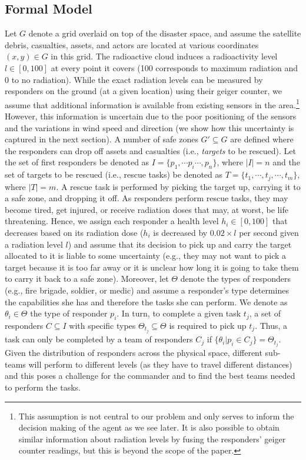 \subsection{Formal Model}
\noindent Let $G$ denote a grid overlaid on top of the disaster space, and assume the satellite debris, casualties, assets, and actors are located at various coordinates $(x,y) \in G$ in this grid. The radioactive cloud induces a radioactivity level  $l \in [0,100]$ at every point it covers (100 corresponds to maximum radiation and 0 to no radiation). While the exact radiation levels can be measured by responders on the ground (at a given location) using their geiger counter, we assume that additional information is available  from existing sensors  in the area.\footnote{This assumption is not central to our problem and only serves to inform the decision making of the agent as we see later. It is also possible to obtain similar information about radiation levels by fusing the responders' geiger counter readings, but this is beyond the scope of the paper.} However, this information is uncertain due to the poor positioning of the sensors and the variations in wind speed and direction (we show how this uncertainty is captured in the next section). A number of safe zones $G' \subseteq G$ are defined where the responders can drop off assets and casualties (i.e., \emph{targets} to be rescued). Let the set of first responders be denoted as $I = \{p_1, \cdots p_i \cdots, p_n\}$, where $|I| = n$ and the set of  targets to be rescued (i.e., rescue tasks) be denoted as  $T = \{t_1,\cdots, t_j, \cdots, t_m\}$, where $|T| = m$. A rescue task is performed by picking the target up, carrying it to a safe zone, and dropping it off.  As responders perform rescue tasks, they may become tired, get injured, or receive radiation doses that may, at worst, be life threatening. Hence, we assign each responder  a health level $h_i\in [0,100]$ that decreases based on its radiation dose ($h_i$ is decreased by $0.02 \times l$ per second given a radiation level $l$) and assume that its decision to pick up and carry the target allocated to it is liable to some uncertainty (e.g., they may not want to pick a target because it is too far away or it is unclear how long it is going to take them to  carry it back  to a safe zone).  Moreover, let $\Theta$ denote the types of responders (e.g., fire brigade, soldier, or medic)  and assume a responder's type determines the capabilities  she has and therefore the tasks  she can perform. We denote as $\theta_i \in \Theta$ the type of responder $p_i$. In turn, to complete a given task $t_j$,  a set of responders $C \subseteq I$ with specific types $\Theta_{t_j} \subseteq \Theta$ is required to pick up $t_j$. Thus, a task can only be completed by a team of responders $C_j$ if $\{\theta_i | p_i \in C_j\} = \Theta_{t_j}$. Given the distribution of responders across the physical space, different sub-teams will perform to different levels (as they have to travel different distances) and this poses a challenge for the commander and to find the best teams needed to perform the tasks.
